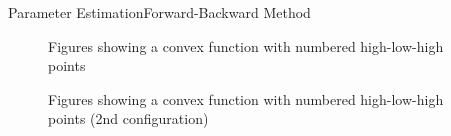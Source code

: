 \begin{frame}{Parameter Estimation}{Forward-Backward Method}
  \begin{minipage}{\linewidth}
    \begin{minipage}{0.35\linewidth}
      \begin{figure}[H]
        \centering
        Figures showing a convex function with numbered high-low-high points
      \end{figure}
    \end{minipage}
    \hspace{0.03\linewidth}
    \begin{minipage}{0.45\linewidth}
      \begin{figure}[H]
        \centering
        Figures showing a convex function with numbered high-low-high points (2nd configuration)
      \end{figure}
    \end{minipage}
  \end{minipage}
\end{frame}

